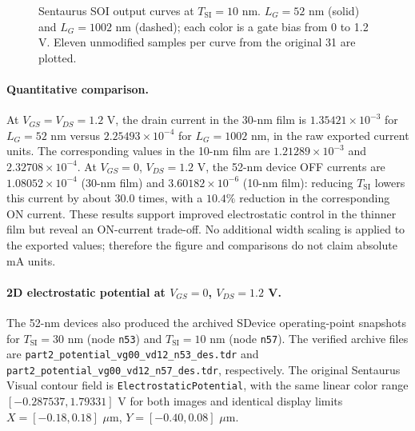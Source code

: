 \begin{figure}[H]
\caption{Sentaurus SOI output curves at $T_{\mathrm{SI}}=10$ nm.
$L_G=52$ nm (solid) and $L_G=1002$ nm (dashed);
each color is a gate bias from 0 to 1.2 V.
Eleven unmodified samples per curve from the original 31 are plotted.}
\label{fig:part2_idvd_tsi10}
\end{figure}

\paragraph{Quantitative comparison.}
At $V_{GS}=V_{DS}=1.2$ V, the drain current in the 30-nm film is
$1.35421\times10^{-3}$ for $L_G=52$ nm versus
$2.25493\times10^{-4}$ for $L_G=1002$ nm, in the
raw exported current units. The corresponding values in the
10-nm film are $1.21289\times10^{-3}$ and
$2.32708\times10^{-4}$. At $V_{GS}=0$, $V_{DS}=1.2$ V,
the 52-nm device OFF currents are $1.08052\times10^{-4}$
(30-nm film) and $3.60182\times10^{-6}$ (10-nm film):
reducing $T_{\mathrm{SI}}$ lowers this current by about $30.0$ times,
with a $10.4\%$ reduction in the corresponding ON current.
These results support improved electrostatic control in the thinner film
but reveal an ON-current trade-off. No additional width scaling is applied to the exported values;
therefore the figure and comparisons do not claim absolute mA units.

\paragraph{2D electrostatic potential at $V_{GS}=0$, $V_{DS}=1.2$ V.}
The 52-nm devices also produced the archived SDevice
operating-point snapshots for $T_{\mathrm{SI}}=30$ nm
(node \texttt{n53}) and $T_{\mathrm{SI}}=10$ nm
(node \texttt{n57}). The verified archive files are
\texttt{part2\_potential\_vg00\_vd12\_n53\_des.tdr} and
\texttt{part2\_potential\_vg00\_vd12\_n57\_des.tdr},
respectively.
The original Sentaurus Visual contour field is
\texttt{ElectrostaticPotential}, with the same
linear color range $[-0.287537,1.79331]$ V for both images and
identical display limits $X=[-0.18,0.18]$ $\mu$m,
$Y=[-0.40,0.08]$ $\mu$m.

